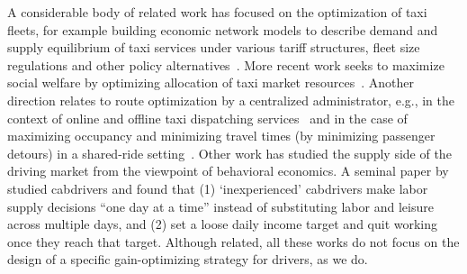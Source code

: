 A considerable body of related work has focused on the optimization of taxi fleets, for
example building economic network models to describe demand and supply equilibrium of taxi 
services under various tariff structures, fleet size regulations and other policy
alternatives~\cite{bailey1987simulation,yang2002demand}.  More recent work seeks to 
maximize social welfare by optimizing allocation of taxi market resources~\cite{shi2016optimization}.
Another direction relates to route optimization by a centralized administrator, e.g., in
the context of online and offline taxi dispatching services~\cite{maciejewski2013simulation,nunes2011taxi} 
and in the case of maximizing occupancy and minimizing travel times (by minimizing passenger detours) 
in a shared-ride setting~\cite{jung2013design}.
Other work has studied the supply side of the driving market from the viewpoint of behavioral economics.
A seminal paper by ~\cite{camerer1997labor} studied cabdrivers and found that  (1) `inexperienced' 
cabdrivers make labor supply decisions ``one day at a time'' instead of substituting labor and leisure 
across multiple days, and  (2) set a loose daily income target and quit working once they reach that 
target.  
Although related, all these works do not focus on the design of a specific gain-optimizing
strategy for drivers, as we do.

